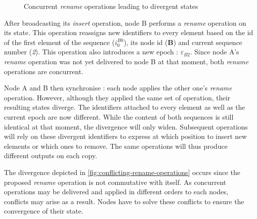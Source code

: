 \documentclass[10pt,journal,compsoc]{IEEEtran}
\let\MYoriglatexcaption\caption
\renewcommand{\caption}[2][\relax]{\MYoriglatexcaption[#2]{#2}}
\newcommand{\trm}[1]{\mathit{#1}}
\newcommand{\id}[3]{$\trm{#1}^{\trm{#2}}_{\trm{#3}}$}
\newcommand{\epoch}[1]{$\varepsilon_{#1}$}
\begin{document}
\begin{figure}[t!]
    \caption{Concurrent \emph{rename} operations leading to divergent states}
    \label{fig:conflicting-rename-operations}
\end{figure}

After broadcasting its \emph{insert} operation, node B performs a \emph{rename} operation on its state.
This operation reassigns new identifiers to every element based on the id of the first element of the sequence (\id{i}{B0}{0}), its node id (\textbf{B}) and current sequence number (\emph{2}).
This operation also introduces a new epoch : \epoch{B2}.
Since node A's \emph{rename} operation was not yet delivered to node B at that moment, both \emph{rename} operations are concurrent.

Node A and B then synchronise : each node applies the other one's \emph{rename} operation.
However, although they applied the same set of operation, their resulting states diverge.
The identifiers attached to every element as well as the current epoch are now different.
While the content of both sequences is still identical at that moment, the divergence will only widen.
Subsequent operations will rely on these divergent identifiers to express at which position to insert new elements or which ones to remove.
The same operations will thus produce different outputs on each copy.

The divergence depicted in \autoref{fig:conflicting-rename-operations} occurs since the proposed \emph{rename} operation is not commutative with itself.
As concurrent operations may be delivered and applied in different orders to each nodes, conflicts may arise as a result.
Nodes have to solve these conflicts to ensure the convergence of their state.
\end{document}
